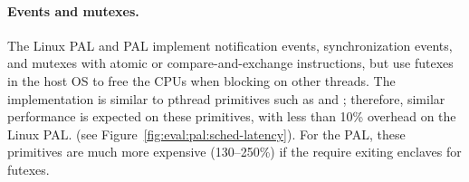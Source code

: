 \paragraph{Events and mutexes.}
The Linux PAL and \sgx{} PAL
implement notification events, synchronization events, and mutexes with atomic or compare-and-exchange
instructions,
but use futexes in the host OS
to free the CPUs when blocking on other threads.
The implementation is similar
to pthread primitives such as  and ;
therefore, similar performance
is expected on these primitives, with less than 10\% overhead on the Linux PAL.
(see Figure~\ref{fig:eval:pal:sched-latency}).
For the \sgx{} PAL,
these primitives
are much more expensive
(\roughly{}130--250\%)
if the \hostapis{} require exiting enclaves
for futexes.









 



